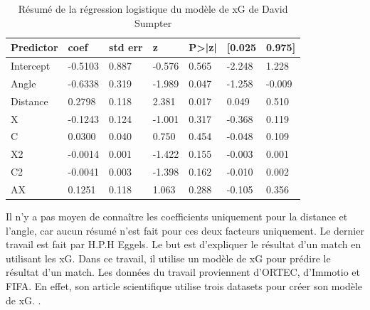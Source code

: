 \documentclass[12pt]{article}
\begin{document}
\begin{table}[htp]
    \centering
    \begin{tabular}{|l|l|l|l|l|l|l|}
    \hline
    \textbf{Predictor} & \textbf{coef} & \textbf{std err} & \textbf{z} & \textbf{P\textgreater{}|z|} & \textbf{{[}0.025} & \textbf{0.975{]}} \\ \hline
    Intercept          & -0.5103       & 0.887            & -0.576     & 0.565                       & -2.248            & 1.228             \\ \hline
    Angle              & -0.6338       & 0.319            & -1.989     & 0.047                       & -1.258            & -0.009            \\ \hline
    Distance           & 0.2798        & 0.118            & 2.381      & 0.017                       & 0.049             & 0.510             \\ \hline
    X                  & -0.1243       & 0.124            & -1.001     & 0.317                       & -0.368            & 0.119             \\ \hline
    C                  & 0.0300        & 0.040            & 0.750      & 0.454                       & -0.048            & 0.109             \\ \hline
    X2                 & -0.0014       & 0.001            & -1.422     & 0.155                       & -0.003            & 0.001             \\ \hline
    C2                 & -0.0041       & 0.003            & -1.398     & 0.162                       & -0.010            & 0.002             \\ \hline
    AX                 & 0.1251        & 0.118            & 1.063      & 0.288                       & -0.105            & 0.356             \\ \hline
    \end{tabular}
    \caption{Résumé de la régression logistique du modèle de xG de David Sumpter}
\end{table}
Il n'y a pas moyen de connaître les coefficients uniquement pour la distance et l'angle, car aucun résumé n'est fait pour ces deux facteurs uniquement.
\newline\newline
Le dernier travail est fait par H.P.H Eggels. 
Le but est d'expliquer le résultat d'un match en utilisant les xG. 
Dans ce travail, il utilise un modèle de xG pour prédire le résultat d'un match.
Les données du travail proviennent d'ORTEC, d'Immotio et FIFA. En effet, son article scientifique utilise trois datasets pour créer son modèle de xG. \cite{eggelsExpectedGoalsSoccer2016}.
\end{document}
